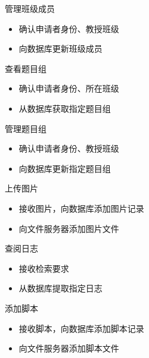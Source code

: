\documentclass{ctexart}
\begin{document}
管理班级成员
\begin{itemize}
    \item 确认申请者身份、教授班级
    \item 向数据库更新班级成员
\end{itemize}

查看题目组
\begin{itemize}
    \item 确认申请者身份、所在班级
    \item 从数据库获取指定题目组
\end{itemize}

管理题目组
\begin{itemize}
    \item 确认申请者身份、教授班级
    \item 向数据库更新指定题目组
\end{itemize}

上传图片
\begin{itemize}
    \item 接收图片，向数据库添加图片记录
    \item 向文件服务器添加图片文件
\end{itemize}

查阅日志
\begin{itemize}
    \item 接收检索要求
    \item 从数据库提取指定日志
\end{itemize}

添加脚本
\begin{itemize}
    \item 接收脚本，向数据库添加脚本记录
    \item 向文件服务器添加脚本文件
\end{itemize}
\end{document}
